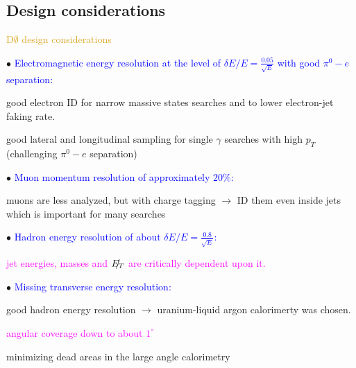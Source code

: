 \subsection{Design considerations}
\begin{frame}{\textcolor{Goldenrod}{D$\emptyset$ design considerations}}
  \itt[<+->]
\item[$\bullet$] \textcolor{blue}{Electromagnetic energy resolution at the level of $\delta E / E
  = \frac{0.05}{\sqrt{E}}$ with good $\pi^0-e $ separation:}
  {\small
    \itt
  \item good electron ID for narrow massive states searches and
    to lower electron-jet faking rate. \\
  \item good lateral and longitudinal sampling for single $\gamma$
    searches with high $p_T$ (\alert{challenging $\pi^0-e $ separation})
    \tti
  }
\item[$\bullet$] \textcolor{blue}{Muon momentum resolution of approximately $20$\%:}
  {\small
    \itt
  \item muons are less analyzed, but with charge tagging $\to$ ID them even inside
    jets which is important for many searches
    \tti
  }
\item[$\bullet$] \textcolor{Blue}{Hadron energy resolution of about $\delta E / E
    = \frac{0.8}{\sqrt{E}}$:}
  {\small
    \itt
  \item \textcolor{Magenta}{jet energies, masses and $\slashed{E_{T}}$ are critically
    dependent upon it.}
    \tti
  }
\item[$\bullet$] \textcolor{Blue}{Missing transverse energy resolution:}
  {\small 
    \itt
  \item good hadron energy resolution $\to$ uranium-liquid argon
    calorimerty was chosen.
    
  \item \textcolor{Magenta}{angular coverage down to about $1^{\circ}$}
    
  \item minimizing dead areas in the large angle calorimetry
    \tti
  }
  \tti   
  
\end{frame}


